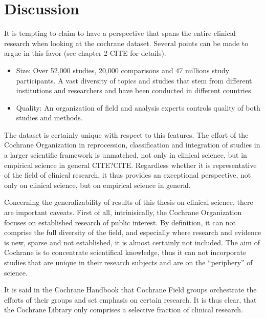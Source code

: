 \documentclass[11pt,a4paper,twoside]{book}\usepackage[]{graphicx}\usepackage[]{color}
\begin{document}




\chapter{Discussion}

It is tempting to claim to have a perspective that spans the entire clinical research when looking at the cochrane dataset. Several points can be made to argue in this favor (see chapter 2 CITE for details).

\begin{itemize}
\item Size: Over 52,000 studies, 20,000 comparisons and 47 millions study participants. A vast diversity of topics and studies that stem from different institutions and researchers and have been conducted in different countries.
\item Quality: An organization of field and analysis experts controls quality of both studies and methods.
\end{itemize}

The dataset is certainly unique with respect to this features. The effort of the Cochrane Organization in reprocession, classification and integration of studies in a larger scientific framework is unmatched, not only in clinical science, but in empirical science in general CITE?CITE. Regardless whether it is representative of the field of clinical research, it thus provides an exceptional perspective, not only on clinical science, but on empirical science in general.

\vspace{0mm}
Concerning the generalizability of results of this thesis on clinical science, there are important caveats. First of all, intrinisically, the Cochrane Organization focuses on established research of public interest. By definition, it can not comprise the full diversity of the field, and especially where research and evidence is new, sparse and not established, it is almost certainly not included. The aim of Cochrane is to concentrate scientifical knowledge, thus it can not incorporate studies that are unique in their research subjects and are on the ``periphery'' of science. 

\vspace{0mm}
It is said in the Cochrane Handbook that Cochrane Field groups orchestrate the efforts of their groups and set emphasis on certain research. It is thus clear, that the Cochrane Library only comprises a selective fraction of clinical research. 
\end{document}
